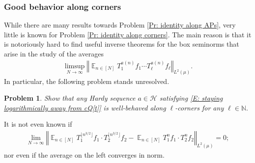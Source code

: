 \documentclass[11pt]{amsart}
\newtheorem{problem}{Problem}
\theoremstyle{definition}
\DeclareMathOperator*{\E}{\mathbb{E}}
\newcommand{\N}{{\mathbb N}}
\newcommand{\Z}{{\mathbb Z}}
\newcommand{\CH}{{\mathcal H}}
\newcommand{\CX}{{\mathcal X}}
\newcommand{\norm}[1]{\left\Vert #1\right\Vert}
\newcommand{\inv}{^{-1}}
\newcommand{\1}{{\mathbf{1}}}
\newcommand{\sfloor}[1]{{\lfloor #1 \rfloor}}
\begin{document}

\subsubsection{Good behavior along corners}
While there are many results towards Problem \ref{Pr: identity along APs}, very little is known for Problem \ref{Pr: identity along corners}. The main reason is that it is notoriously hard to find useful inverse theorems for the box seminorms that arise in the study of the averages
\begin{align*}%
        \limsup_{N\to\infty}\norm{\E_{n\in[N]}T_1^{a(n)}f_1\cdots T_\ell^{a(n)}f_\ell}_{L^2(\mu)}.
\end{align*}
In particular, the following problem stands unresolved.
\begin{problem}\label{Pr: Hardy well-behaved along corners}
    Show that any Hardy sequence $a\in\CH$ satisfying \eqref{E: staying logarithmically away from cQ[t]} is well-behaved along $\ell$-corners for any $\ell\in\N.$
\end{problem}
It is not even known if 
\begin{align*}
    \lim_{N\to\infty}\norm{\E_{n\in[N]}T_1^{\sfloor{n^{3/2}}}f_1\cdot T_2^{\sfloor{n^{3/2}}}f_2-\E_{n\in[N]}T_1^n f_1\cdot T_2^n f_2}_{L^2(\mu)} = 0;
\end{align*}
nor even if the average on the left converges in norm.
\end{document}

